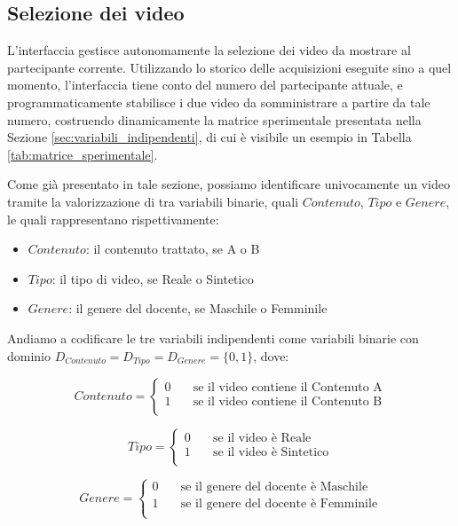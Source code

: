 \subsection{Selezione dei video}

L'interfaccia gestisce autonomamente la selezione dei video da mostrare al partecipante corrente. Utilizzando lo storico delle acquisizioni eseguite sino a quel momento, l'interfaccia tiene conto del numero del partecipante attuale, e programmaticamente stabilisce i due video da somministrare a partire da tale numero, costruendo dinamicamente la matrice sperimentale presentata nella Sezione \ref{sec:variabili_indipendenti}, di cui è visibile un esempio in Tabella \ref{tab:matrice_sperimentale}.

Come già presentato in tale sezione, possiamo identificare univocamente un video tramite la valorizzazione di tra variabili binarie, quali $Contenuto$, $Tipo$ e $Genere$, le quali rappresentano rispettivamente:
\begin{itemize}
    \item $Contenuto$: il contenuto trattato, se A o B
    \item $Tipo$: il tipo di video, se Reale o Sintetico
    \item $Genere$: il genere del docente, se Maschile o Femminile
\end{itemize}

Andiamo a codificare le tre variabili indipendenti come variabili binarie con dominio $D_{Contenuto} = D_{Tipo} = D_{Genere} = \{0,1\}$, dove:

$$
Contenuto = 
     \begin{cases}
       0 &\quad\text{se il video contiene il Contenuto A} \\
       1 &\quad\text{se il video contiene il Contenuto B} \\
     \end{cases}
$$

$$
Tipo = 
     \begin{cases}
       0 &\quad\text{se il video è Reale} \\
       1 &\quad\text{se il video è Sintetico} \\
     \end{cases}
$$

$$
Genere = 
     \begin{cases}
       0 &\quad\text{se il genere del docente è Maschile} \\
       1 &\quad\text{se il genere del docente è Femminile} \\
     \end{cases}
$$

